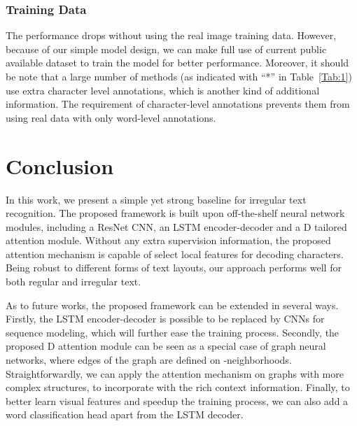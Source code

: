 \documentclass[letterpaper]{article} \usepackage{aaai19}  \usepackage{times}  \usepackage{helvet}  \usepackage{courier}  \usepackage{url}  \usepackage{graphicx}  \usepackage{amsmath}
\begin{document}
\subsubsection{\bf Training Data}
The performance drops without using the real image training data. However, because of our simple model design, we can make full use of current public available dataset to train the model for better performance. Moreover, it should be note that a large number of methods (as indicated with ``*'' in Table~\ref{Tab:1}) use extra character level annotations, which is another kind of additional information. The requirement of character-level annotations prevents them from using real data with only word-level annotations.




\section{Conclusion}
\label{SEC:Con}
In this work, we present a simple yet strong baseline for irregular text recognition.
The proposed framework is built upon off-the-shelf neural network modules, including a ResNet CNN, an LSTM encoder-decoder and
a D tailored attention module.
Without any extra supervision information, the proposed attention mechanism is capable of select local features for decoding characters.
Being robust to different forms of text layouts, our approach performs well for both regular and irregular text.

As to future works, the proposed framework can be extended in several ways.
Firstly, the LSTM encoder-decoder is possible to be replaced by CNNs for sequence modeling, which will further ease the training process.
Secondly, the proposed D attention module can be seen as a special case of graph neural networks, where edges of the graph are defined on -neighborhoods.
Straightforwardly, we can apply the attention mechanism on graphs with more complex structures, to incorporate with the rich context information.
Finally, to better learn visual features and speedup the training process, we can also add a word classification head apart from the LSTM decoder.




\end{document}
